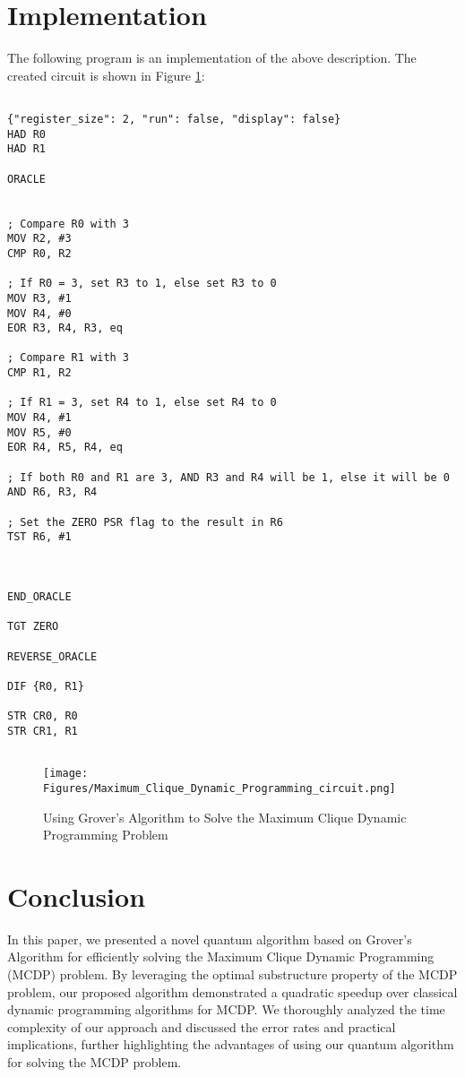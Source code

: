 \section{Implementation}

The following program is an implementation of the above description. The created circuit is shown in Figure \ref{fig:Maximum_Clique_Dynamic_Programming}:

\begin{lstlisting}

{"register_size": 2, "run": false, "display": false}
HAD R0
HAD R1

ORACLE


; Compare R0 with 3
MOV R2, #3
CMP R0, R2

; If R0 = 3, set R3 to 1, else set R3 to 0
MOV R3, #1
MOV R4, #0
EOR R3, R4, R3, eq

; Compare R1 with 3
CMP R1, R2

; If R1 = 3, set R4 to 1, else set R4 to 0
MOV R4, #1
MOV R5, #0
EOR R4, R5, R4, eq

; If both R0 and R1 are 3, AND R3 and R4 will be 1, else it will be 0
AND R6, R3, R4

; Set the ZERO PSR flag to the result in R6
TST R6, #1



END_ORACLE

TGT ZERO

REVERSE_ORACLE

DIF {R0, R1}

STR CR0, R0
STR CR1, R1


\end{lstlisting}

\begin{figure}[htp]
    \centering
    \texttt{[image: Figures/Maximum\_Clique\_Dynamic\_Programming\_circuit.png]}
    \caption{Using Grover's Algorithm to Solve the Maximum Clique Dynamic Programming Problem}
    \label{fig:Maximum_Clique_Dynamic_Programming}
\end{figure}

\section{Conclusion}\label{sec:conclusion}

In this paper, we presented a novel quantum algorithm based on Grover's Algorithm for efficiently solving the Maximum Clique Dynamic Programming (MCDP) problem. By leveraging the optimal substructure property of the MCDP problem, our proposed algorithm demonstrated a quadratic speedup over classical dynamic programming algorithms for MCDP. We thoroughly analyzed the time complexity of our approach and discussed the error rates and practical implications, further highlighting the advantages of using our quantum algorithm for solving the MCDP problem.

